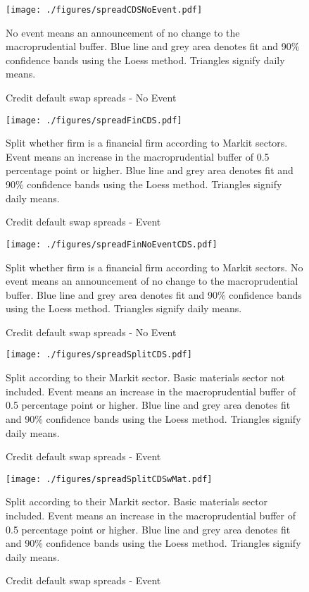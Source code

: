 \documentclass[11pt]{article}
\newcommand\fnote[1]{\captionsetup{font=small}\caption*{#1}}
\begin{document}
\begin{figure}%
	\centering
	\texttt{[image: ./figures/spreadCDSNoEvent.pdf]}
	\caption{Credit default swap spreads - No Event}
	\label{fig:eventCDSNoEvent}
	\fnote{No event means an announcement of no change to the macroprudential buffer. Blue line and grey area denotes fit and 90\% confidence bands using the Loess method. Triangles signify daily means.}
\end{figure}


\begin{figure}%
	\centering
	\texttt{[image: ./figures/spreadFinCDS.pdf]}
	\caption{Credit default swap spreads - Event}
	\label{fig:eventCDSFin}
	\fnote{Split whether firm is a financial firm according to Markit sectors. Event means an increase in the macroprudential buffer of 0.5 percentage point or higher. Blue line and grey area denotes fit and 90\% confidence bands using the Loess method. Triangles signify daily means.}
\end{figure}

\begin{figure}%
	\centering
	\texttt{[image: ./figures/spreadFinNoEventCDS.pdf]}
	\caption{Credit default swap spreads - No Event}
	\label{fig:eventCDSFinNoEvent}
	\fnote{Split whether firm is a financial firm according to Markit sectors. No event means an announcement of no change to the macroprudential buffer. Blue line and grey area denotes fit and 90\% confidence bands using the Loess method. Triangles signify daily means.}
\end{figure}


\begin{figure}%
	\centering
	\texttt{[image: ./figures/spreadSplitCDS.pdf]}
	\caption{Credit default swap spreads - Event}
	\label{fig:eventCDSSplit}
	\fnote{Split according to their Markit sector. Basic materials sector not included. Event means an increase in the macroprudential buffer of 0.5 percentage point or higher. Blue line and grey area denotes fit and 90\% confidence bands using the Loess method. Triangles signify daily means.}
\end{figure}

\begin{figure}%
	\centering
	\texttt{[image: ./figures/spreadSplitCDSwMat.pdf]}
	\caption{Credit default swap spreads - Event}
	\label{fig:eventCDSSplitwMat}
	\fnote{Split according to their Markit sector. Basic materials sector included. Event means an increase in the macroprudential buffer of 0.5 percentage point or higher. Blue line and grey area denotes fit and 90\% confidence bands using the Loess method. Triangles signify daily means.}
\end{figure}
\end{document}
